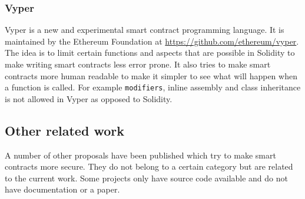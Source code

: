 \documentclass[a4paper]{article}
\begin{document}
\subsubsection{Vyper}
Vyper is a new and experimental smart contract programming language. It is maintained by the Ethereum Foundation at \url{https://github.com/ethereum/vyper}. The idea is to limit certain functions and aspects that are possible in Solidity to make writing smart contracts less error prone. It also tries to make smart contracts more human readable to make it simpler to see what will happen when a function is called. For example \texttt{modifiers}, inline assembly and class inheritance is not allowed in Vyper as opposed to Solidity. 

\subsection{Other related work}
A number of other proposals have been published which try to make smart contracts more secure. They do not belong to a certain category but are related to the current work. Some projects only have source code available and do not have documentation or a paper.
\end{document}
